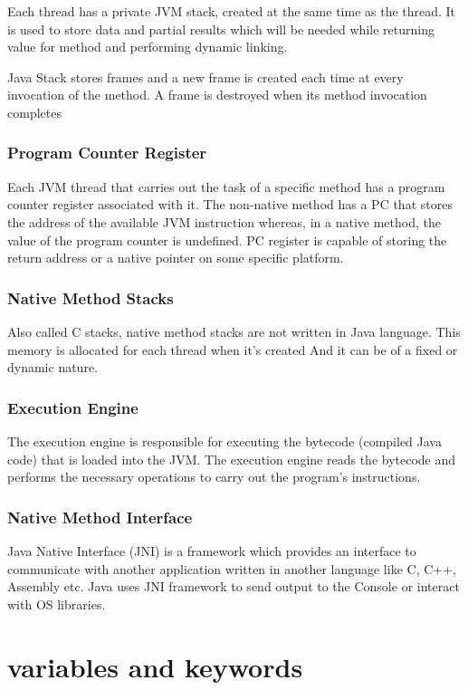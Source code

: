 \documentclass{article}
\begin{document}
Each thread has a private JVM stack, created at the same time as the thread. It is used to store data and partial results which will be needed while returning value for method and performing dynamic linking.

Java Stack stores frames and a new frame is created each time at every invocation of the method. A frame is destroyed when its method invocation completes

\subsubsection{Program Counter Register}

Each JVM thread that carries out the task of a specific method has a program counter register associated with it. The non-native method has a PC that stores the address of the available JVM instruction whereas, in a native method, the value of the program counter is undefined. PC register is capable of storing the return address or a native pointer on some specific platform.

\subsubsection{Native Method Stacks}

Also called C stacks, native method stacks are not written in Java language. This memory is allocated for each thread when it’s created And it can be of a fixed or dynamic nature.

\subsubsection{Execution Engine}

The execution engine is responsible for executing the bytecode (compiled Java code) that is loaded into the JVM. The execution engine reads the bytecode and performs the necessary operations to carry out the program’s instructions.

\subsubsection{Native Method Interface}

Java Native Interface (JNI) is a framework which provides an interface to communicate with another application written in another language like C, C++, Assembly etc. Java uses JNI framework to send output to the Console or interact with OS libraries.


\section{variables and keywords}
    
\end{document}
